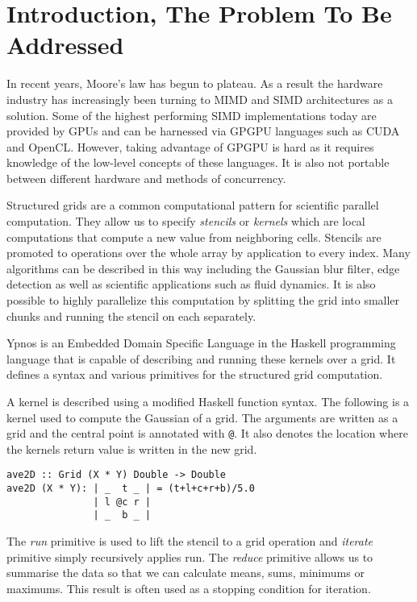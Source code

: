 





\section*{Introduction, The Problem To Be Addressed}

In recent years, Moore's law has begun to plateau. As a result the hardware 
industry has increasingly been turning to MIMD and SIMD architectures as a 
solution.  Some of the highest performing SIMD implementations today are 
provided by GPUs and can be harnessed via GPGPU languages such as CUDA and 
OpenCL.  However, taking advantage of GPGPU is hard as it requires knowledge of 
the low-level concepts of these languages. It is also not portable between 
different hardware and methods of concurrency.

Structured grids are a common computational pattern for scientific parallel 
computation. They allow us to specify \emph{stencils} or \emph{kernels} which 
are local computations that compute a new value from neighboring cells.  
Stencils are promoted to operations over the whole array by application to 
every index.  Many algorithms can be described in this way including the 
Gaussian blur filter, edge detection as well as scientific applications such as 
fluid dynamics. It is also possible to highly parallelize this computation by 
splitting the grid into smaller chunks and running the stencil on each 
separately.

Ypnos \cite{ypnos} is an Embedded Domain Specific Language in the Haskell 
programming language that is capable of describing and running these kernels 
over a grid.  It defines a syntax and various primitives for the structured 
grid computation.  

A kernel is described using a modified Haskell function syntax. The following 
is a kernel used to compute the Gaussian of a grid. The arguments are written 
as a grid and the central point is annotated with \verb|@|. It also denotes the 
location where the kernels return value is written in the new grid.

\begin{verbatim}
ave2D :: Grid (X * Y) Double -> Double
ave2D (X * Y): | _  t _ | = (t+l+c+r+b)/5.0
               | l @c r |
               | _  b _ |
\end{verbatim}

The \emph{run} primitive is used to lift the stencil to a grid operation and 
\emph{iterate} primitive simply recursively applies run. The \emph{reduce} 
primitive allows us to summarise the data so that we can calculate means, sums, 
minimums or maximums. This result is often used as a stopping condition for 
iteration.

